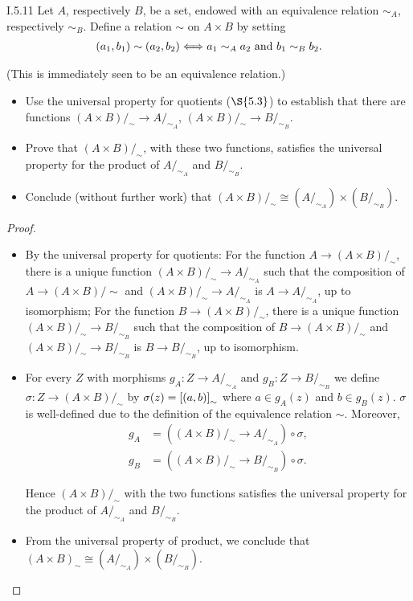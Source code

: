 \begin{exercise}{I.5.11}
	Let $A$, respectively $B$, be a set, endowed with an equivalence relation $\sim_{A}$, respectively $\sim_{B}$. Define a relation $\sim$ on $A\times B$ by setting
	\begin{align*}
		\left({a_{1}, b_{1}}\right) \sim \left({a_{2}, b_{2}}\right) \Longleftrightarrow a_{1} \sim_{A} a_{2} \text{ and } b_{1} \sim_{B} b_{2}.
	\end{align*}

	(This is immediately seen to be an equivalence relation.)
	\begin{itemize}
		\item Use the universal property for quotients ($\S{5.3}$) to establish that there are functions ${(A\times B)}/_{\sim} \to A/_{\sim_{A}}$, $(A\times B)/_{\sim} \to B/_{\sim_{B}}$.
		\item Prove that ${(A \times B)/_{\sim}}$, with these two functions, satisfies the universal property for the product of $A/_{\sim_{A}}$ and $B/_{\sim_{B}}$.
		\item Conclude (without further work) that $(A\times B)/_{\sim} \cong (A/_{\sim_{A}})\times (B/_{\sim_{B}})$.
	\end{itemize}
\end{exercise}

\begin{proof}
	\begin{itemize}
		\item By the universal property for quotients: For the function $A\to (A\times B)/_{\sim}$, there is a unique function ${(A\times B)}/_{\sim} \to A/_{\sim_{A}}$ such that the composition of $A\to (A\times B)/\sim$ and ${(A\times B)}/_{\sim} \to A/_{\sim_{A}}$ is $A\to A/_{\sim_{A}}$, up to isomorphism; For the function $B\to {(A\times B)}/_{\sim}$, there is a unique function ${(A\times B)}/_{\sim} \to B/_{\sim_{B}}$ such that the composition of $B\to (A\times B)/_{\sim}$ and ${(A\times B)}/_{\sim} \to B/_{\sim_{B}}$ is $B\to B/_{\sim_{B}}$, up to isomorphism.
		\item For every $Z$ with morphisms $g_{A}: Z\to A/_{\sim_{A}}$ and $g_{B}: Z\to B/_{\sim_{B}}$ we define $\sigma: Z\to {(A\times B)/_{\sim}}$ by $\sigma(z) = {[\left({a, b}\right)]}_{\sim}$ where $a\in g_{A}(z)$ and $b\in g_{B}(z)$. $\sigma$ is well-defined due to the definition of the equivalence relation $\sim$. Moreover,
		      \begin{align*}
			      g_{A} & = ((A\times B)/_{\sim}\to A/_{\sim_{A}})\circ \sigma, \\
			      g_{B} & = ((A\times B)/_{\sim}\to B/_{\sim_{B}})\circ \sigma.
		      \end{align*}

		      Hence $(A\times B)/_{\sim}$ with the two functions satisfies the universal property for the product of $A/_{\sim_{A}}$ and $B/_{\sim_{B}}$.
		\item From the universal property of product, we conclude that ${(A\times B)}_{\sim} \cong (A/_{\sim_{A}})\times (B/_{\sim_{B}})$.
	\end{itemize}
\end{proof}

